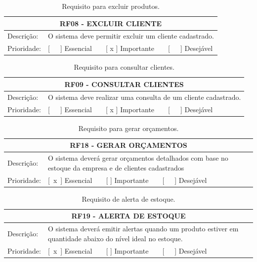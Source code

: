 \begin{anexosenv}
\begin{table}[htbp]
\centering
\caption{Requisito para excluir produtos.}
\label{tab:rf08}
\begin{tabular}{l p{10cm}}
\toprule
\multicolumn{2}{c}{RF08 - EXCLUIR CLIENTE} \\ \midrule
Descrição:  & O sistema deve permitir excluir um cliente cadastrado.\\ \midrule
Prioridade: & [   ] Essencial    [ x ] Importante    [   ] Desejável \\ \bottomrule
\end{tabular}
\end{table}

\begin{table}[htbp]
\centering
\caption{Requisito para consultar clientes.}
\label{tab:rf09}
\begin{tabular}{l p{10cm}}
\toprule
\multicolumn{2}{c}{RF09 - CONSULTAR CLIENTES} \\ \midrule
Descrição:  & O sistema deve realizar uma consulta de um cliente cadastrado.\\ \midrule
Prioridade: & [   ] Essencial    [ x ] Importante    [   ] Desejável \\ \bottomrule
\end{tabular}
\end{table}

\begin{table}[htbp]
	\centering
	\caption{Requisito para gerar orçamentos.}
	\label{tab:rf18}
	\begin{tabular}{l p{10cm}}
		\toprule
		\multicolumn{2}{c}{RF18 - GERAR ORÇAMENTOS} \\ \midrule
		Descrição:  & O sistema deverá gerar orçamentos detalhados com base no estoque da empresa e de clientes cadastrados \\ \midrule
		Prioridade: & [ x ] Essencial    [   ] Importante    [   ] Desejável \\ \bottomrule
	\end{tabular}
\end{table}

\begin{table}[htbp]
	\centering
	\caption{Requisito de alerta de estoque.}
	\label{tab:rf19}
	\begin{tabular}{l p{10cm}}
		\toprule
		\multicolumn{2}{c}{RF19 - ALERTA DE ESTOQUE} \\ \midrule
		Descrição:  & O sistema deverá emitir alertas quando um produto estiver em quantidade abaixo do nível ideal no estoque.\\ \midrule
		Prioridade: & [ x ] Essencial    [   ] Importante    [   ] Desejável \\ \bottomrule
	\end{tabular}
\end{table}
	

\end{anexosenv}
